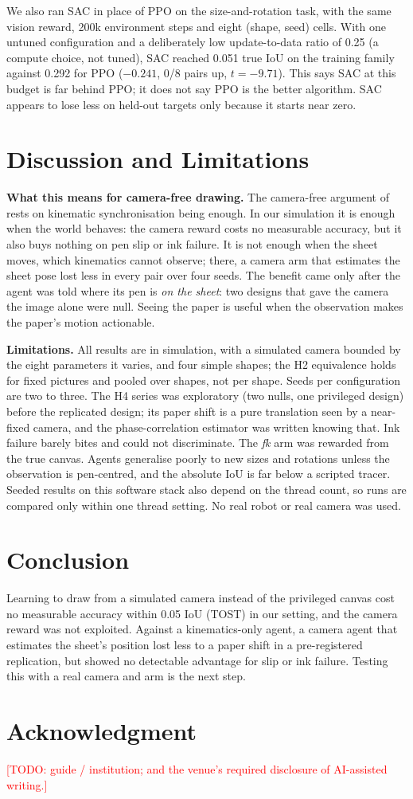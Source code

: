 \documentclass[conference]{IEEEtran}
\newcommand{\TODO}[1]{\textcolor{red}{[TODO: #1]}}
\begin{document}
We also ran SAC in place of PPO on the size-and-rotation task, with the same vision reward, 200k
environment steps and eight (shape, seed) cells. With one untuned configuration and a
deliberately low update-to-data ratio of 0.25 (a compute choice, not tuned), SAC reached 0.051
true IoU on the training family against 0.292 for PPO ($-0.241$, 0/8 pairs up, $t=-9.71$). %
This says SAC at this budget is far behind PPO; it does not say PPO is the better algorithm. SAC
appears to lose less on held-out targets only because it starts near zero.

\section{Discussion and Limitations}
\textbf{What this means for camera-free drawing.} The camera-free argument of~\cite{D01}
rests on kinematic synchronisation being enough. In our simulation it is enough when the
world behaves: the camera reward costs no measurable accuracy, but it also buys nothing on
pen slip or ink failure. It is not enough when the sheet moves, which kinematics cannot
observe; there, a camera arm that estimates the sheet pose lost less in every pair over
four seeds. The benefit came only after the agent was told where its pen is \emph{on the
sheet}: two designs that gave the camera the image alone were null. Seeing the paper is
useful when the observation makes the paper's motion actionable.

\textbf{Limitations.} All results are in simulation, with a simulated camera bounded by the
eight parameters it varies, and four simple shapes; the H2 equivalence holds for fixed
pictures and pooled over shapes, not per shape. Seeds per configuration are two to three.
The H4 series was exploratory (two nulls, one privileged design) before the replicated
design; its paper shift is a pure translation seen by a near-fixed camera, and the
phase-correlation estimator was written knowing that. Ink failure barely bites and could
not discriminate. The \emph{fk} arm was rewarded from the true canvas. Agents generalise
poorly to new sizes and rotations unless the observation is pen-centred, and the absolute
IoU is far below a scripted tracer. Seeded results on this software stack also depend on
the thread count, so runs are compared only within one thread setting. No real robot or
real camera was used.

\section{Conclusion}
Learning to draw from a simulated camera instead of the privileged canvas cost no
measurable accuracy within 0.05 IoU (TOST) in our setting, and the camera reward was not %
exploited. Against a kinematics-only agent, a camera agent that estimates the sheet's
position lost less to a paper shift in a pre-registered replication, but showed no
detectable advantage for slip or ink failure. Testing this with a real camera and arm is
the next step.

\section*{Acknowledgment}
\TODO{guide / institution; and the venue's required disclosure of AI-assisted writing.}



\end{document}
